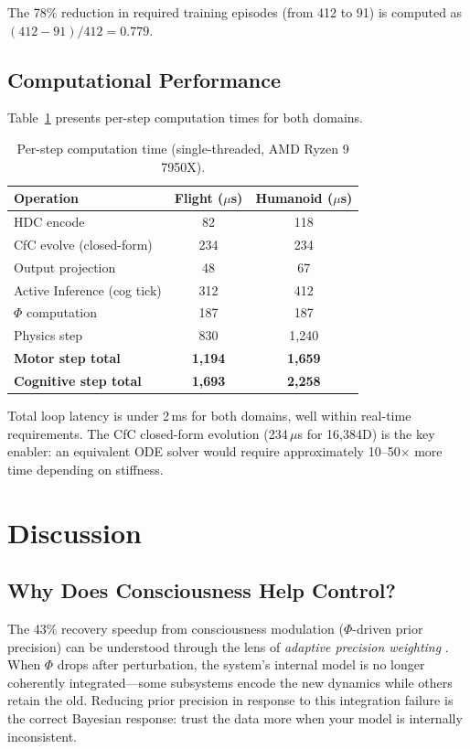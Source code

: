 \documentclass[11pt,a4paper]{article}
\begin{document}
The 78\% reduction in required training episodes (from 412 to 91) is computed as $(412 - 91)/412 = 0.779$.

\subsection{Computational Performance}

Table~\ref{tab:timing} presents per-step computation times for both domains.

\begin{table}[h]
\centering
\caption{Per-step computation time (single-threaded, AMD Ryzen 9 7950X).}
\label{tab:timing}
\begin{tabular}{lcc}
\toprule
\textbf{Operation} & \textbf{Flight ($\mu$s)} & \textbf{Humanoid ($\mu$s)} \\
\midrule
HDC encode                  & 82   & 118  \\
CfC evolve (closed-form)    & 234  & 234  \\
Output projection           & 48   & 67   \\
Active Inference (cog tick) & 312  & 412  \\
$\Phi$ computation          & 187  & 187  \\
Physics step                & 830  & 1,240 \\
\midrule
\textbf{Motor step total}   & \textbf{1,194} & \textbf{1,659} \\
\textbf{Cognitive step total} & \textbf{1,693} & \textbf{2,258} \\
\bottomrule
\end{tabular}
\end{table}

Total loop latency is under 2\,ms for both domains, well within real-time requirements.
The CfC closed-form evolution (234\,$\mu$s for 16,384D) is the key enabler: an equivalent ODE solver would require approximately 10--50$\times$ more time depending on stiffness.

\section{Discussion}
\label{sec:discussion}

\subsection{Why Does Consciousness Help Control?}

The 43\% recovery speedup from consciousness modulation ($\Phi$-driven prior precision) can be understood through the lens of \emph{adaptive precision weighting} \citep{friston2010free, feldman2010attention}.
When $\Phi$ drops after perturbation, the system's internal model is no longer coherently integrated---some subsystems encode the new dynamics while others retain the old.
Reducing prior precision in response to this integration failure is the correct Bayesian response: trust the data more when your model is internally inconsistent.
\end{document}
